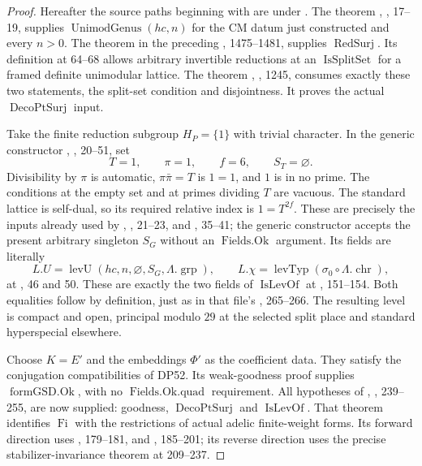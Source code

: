 \begin{proof}
Hereafter the source paths beginning with  are under
.
The theorem ,
, 17--19, supplies
$\operatorname{UnimodGenus}(hc,n)$ for the CM datum just constructed
and every $n>0$.
The theorem  in the preceding
, 1475--1481, supplies
$\operatorname{RedSurj}$.
Its definition at 64--68 allows arbitrary invertible reductions
at an $\operatorname{IsSplitSet}$ for a framed definite unimodular lattice.
The theorem ,
, 1245, consumes exactly these two statements,
the split-set condition and disjointness.
It proves the actual $\operatorname{DecoPtSurj}$ input.

Take the finite reduction subgroup $H_P=\{1\}$ with trivial
character. In the generic constructor
, , 20--51,
set
\[
 T=1,\qquad \pi=1,\qquad f=6,\qquad S_T=\varnothing.
\]
Divisibility by $\pi$ is automatic, $\pi\bar\pi=T$ is $1=1$,
and $1$ is in no prime. The conditions at the empty set and at
primes dividing $T$ are vacuous.
The standard lattice is self-dual, so its required relative index
is $1=T^{2f}$.
These are precisely the inputs already used by
, , 21--23,
and , 35--41; the generic constructor accepts the
present arbitrary singleton $S_G$ without an
$\operatorname{Fields.Ok}$ argument.
Its fields are literally
\[
 L.U=\operatorname{levU}(hc,n,\varnothing,S_G,\Lambda.\operatorname{grp}),
 \qquad
 L.\chi=\operatorname{levTyp}(\sigma_0\circ\Lambda.\operatorname{chr}),
\]
at , 46 and 50.
These are exactly the two fields of
$\operatorname{IsLevOf}$ at , 151--154.
Both equalities follow by definition, just as in that file's
, 265--266.
The resulting level is compact and open, principal modulo $29$
at the selected split place and standard hyperspecial elsewhere.

Choose $K=E'$ and the embeddings $\Phi'$ as the coefficient data.
They satisfy the conjugation compatibilities of DP52.
Its weak-goodness proof supplies
$\operatorname{formGSD.Ok}$, with no
$\operatorname{Fields.Ok.quad}$ requirement.
All hypotheses of ,
, 239--255, are now supplied:
goodness, $\operatorname{DecoPtSurj}$ and
$\operatorname{IsLevOf}$.
That theorem identifies $\operatorname{Fi}$ with the restrictions
of actual adelic finite-weight forms.
Its forward direction uses , 179--181, and
, 185--201; its reverse direction uses
the precise stabilizer-invariance theorem at 209--237.


\end{proof}
